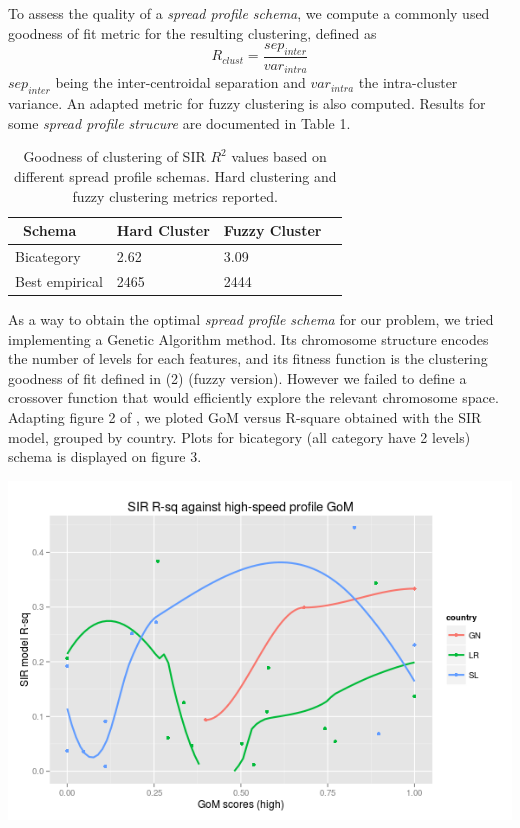 \documentclass[twoside]{article}
\begin{document}
To assess the quality of a \textit{spread profile schema}, we compute a commonly used goodness of fit metric for the resulting clustering, defined as
\begin{equation}
R_{clust} = \frac{sep_{inter}}{var_{intra}}
\end{equation}
$sep_{inter}$ being the inter-centroidal separation and $var_{intra}$ the intra-cluster variance. An adapted metric for fuzzy clustering is also computed. Results for some \textit{spread profile strucure} are documented in Table 1.\\

\begin{table}
\caption{Goodness of clustering of SIR $R^2$ values based on different spread profile schemas. Hard clustering and fuzzy clustering metrics reported.}
\label{aic}
\centering
\begin{tabular}{llll}
\toprule\
Schema & Hard Cluster & Fuzzy Cluster\\
\midrule
Bicategory & 2.62  & 3.09 \\
Best empirical & 2465 & 2444\\
\bottomrule
\end{tabular}
\end{table}


As a way to obtain the optimal \textit{spread profile schema} for our problem, we tried implementing a Genetic Algorithm method. Its chromosome structure encodes the number of levels for each features, and its fitness function is the clustering goodness of fit defined in (2) (fuzzy version). However we failed to define a crossover function that would efficiently explore the relevant chromosome space.\\

Adapting figure 2 of \cite{malaria}, we ploted GoM versus R-square obtained with the SIR model, grouped by country. Plots for bicategory (all category have 2 levels) schema is displayed on figure 3.

\vspace{.2 in}
\begingroup
\centering
\includegraphics[scale=0.35]{./img/gom_rsq_bicat.png}
\endgroup
\end{document}
